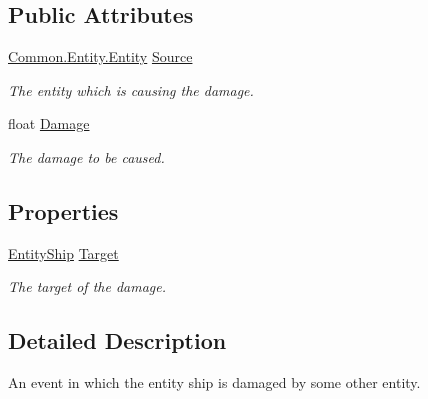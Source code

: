 \subsection*{Public Attributes}
\begin{DoxyCompactItemize}
\item 
\hyperlink{class_skyrates_1_1_common_1_1_entity_1_1_entity}{Common.\-Entity.\-Entity} \hyperlink{class_skyrates_1_1_client_1_1_game_1_1_event_1_1_event_entity_ship_damaged_a4cd32fb813a20f289425daf9c964d692}{Source}
\begin{DoxyCompactList}\small\item\em The entity which is causing the damage. \end{DoxyCompactList}\item 
float \hyperlink{class_skyrates_1_1_client_1_1_game_1_1_event_1_1_event_entity_ship_damaged_a1e4d02b92dcb9e8b957e70c7857d96d7}{Damage}
\begin{DoxyCompactList}\small\item\em The damage to be caused. \end{DoxyCompactList}\end{DoxyCompactItemize}
\subsection*{Properties}
\begin{DoxyCompactItemize}
\item 
\hyperlink{class_skyrates_1_1_client_1_1_entity_1_1_entity_ship}{Entity\-Ship} \hyperlink{class_skyrates_1_1_client_1_1_game_1_1_event_1_1_event_entity_ship_damaged_abfb55cdb6205f8e4ecf35b8c93ae39b6}{Target}
\begin{DoxyCompactList}\small\item\em The target of the damage. \end{DoxyCompactList}\end{DoxyCompactItemize}


\subsection{Detailed Description}
An event in which the entity ship is damaged by some other entity. 



